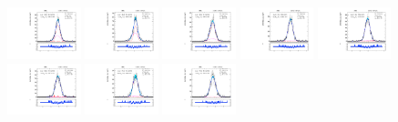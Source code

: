 \begin{figure}[htb]
\includegraphics[width=0.19\textwidth]{plots/Appendix_Recoil_Fits/ZmmData_PF_13TeV_2G_bkg/pfu1fit_24.pdf}
\includegraphics[width=0.19\textwidth]{plots/Appendix_Recoil_Fits/ZmmData_PF_13TeV_2G_bkg/pfu1fit_25.pdf}
\includegraphics[width=0.19\textwidth]{plots/Appendix_Recoil_Fits/ZmmData_PF_13TeV_2G_bkg/pfu1fit_26.pdf}
\includegraphics[width=0.19\textwidth]{plots/Appendix_Recoil_Fits/ZmmData_PF_13TeV_2G_bkg/pfu1fit_27.pdf}
\includegraphics[width=0.19\textwidth]{plots/Appendix_Recoil_Fits/ZmmData_PF_13TeV_2G_bkg/pfu1fit_28.pdf}
\includegraphics[width=0.19\textwidth]{plots/Appendix_Recoil_Fits/ZmmData_PF_13TeV_2G_bkg/pfu1fit_29.pdf}
\includegraphics[width=0.19\textwidth]{plots/Appendix_Recoil_Fits/ZmmData_PF_13TeV_2G_bkg/pfu1fit_30.pdf}
\includegraphics[width=0.19\textwidth]{plots/Appendix_Recoil_Fits/ZmmData_PF_13TeV_2G_bkg/pfu1fit_31.pdf}

\end{figure}

